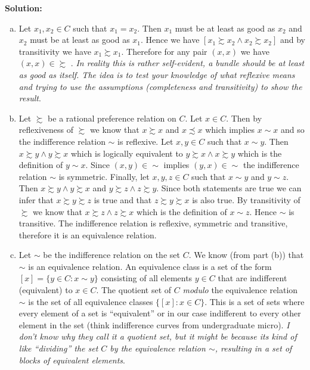\documentclass[a4paper,11pt]{article}
\newenvironment{solution}{ \noindent \textbf{Solution: \medskip}}{}
\begin{document}
\begin{solution}
	\begin{enumerate}[(a)]
		\item Let $x_1,x_2 \in C$ such that $x_1 = x_2$.
		Then $x_1$ must be at least as good as $x_2$ and $x_2$ must be at least as good as $x_1$.
		Hence we have $[x_1\succsim x_2 \wedge x_2 \succsim x_2]$ and by transitivity we have $x_1 \succsim x_1$.
		Therefore for any pair $(x,x)$ we have $(x,x) \in \succsim$ \qedsymbol.
		\emph{In reality this is rather self-evident, a bundle should be at least as good as itself.  The idea is to test your knowledge of what reflexive means and trying to use the assumptions (completeness and transitivity) to show the result}.
		\item Let $\succsim$ be a rational preference relation on $C$.
		Let $x \in C$.
		Then by reflexiveness of $\succsim$ we know that $x \succsim x$ and $x \precsim x$ which implies $x \sim x$ and so the indifference relation $\sim$ is reflexive.
		Let $x,y \in C$ such that $x \sim y$.
		Then $x \succsim y \wedge y \succsim x$ which is logically equivalent to $y\succsim x \wedge x \succsim y$ which is the definition of $y \sim x$.
		Since $(x,y) \in \sim$ implies $(y,x) \in \sim$ the indifference relation $\sim$ is symmetric.
		Finally, let $x,y,z \in C$ such that $x \sim y$ and $y \sim z$.
		Then $x \succsim y \wedge y\succsim x$ and $y\succsim z \wedge z \succsim y$.
		Since both statements are true we can infer that $x \succsim y \succsim z$ is true and that $z \succsim y \succsim x$ is also true.
		By transitivity of $\succsim$ we know that $x \succsim z \wedge z \succsim x$ which is the definition of $x \sim z$.
		Hence $\sim$ is transitive.
		The indifference relation is reflexive, symmetric and transitive, therefore it is an equivalence relation. \qedsymbol
		\item Let $\sim$ be the indifference relation on the set $C$.
		We know (from part (b)) that $\sim$ is an equivalence relation.
		An equivalence class is a set of the form $[x] = \{ y \in C : x \sim y \}$ consisting of all elements $y \in C$ that are indifferent (equivalent) to  $x \in C$.
		The quotient set of $C$ \emph{modulo} the equivalence relation $\sim$ is the set of all equivalence classes $\{ [x] : x \in C\}$.
		This is a set of sets where every element of a set is ``equivalent'' or in our case indifferent to every other element in the set (think indifference curves from undergraduate micro).
		\emph{I don't know why they call it a quotient set, but it might be because its kind of like ``dividing'' the set $C$ by the equivalence relation $\sim$, resulting in a set of blocks of equivalent elements}.

\end{enumerate}
\end{solution}
\end{document}
